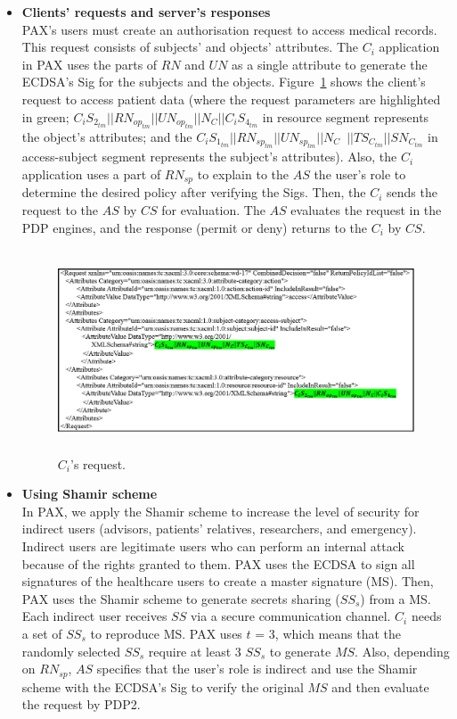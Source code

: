 \documentclass[journal,article,submit,moreauthors,pdftex]{Definitions/mdpi}
\begin{document}
\begin{itemize}
\item \textbf{Clients' requests and server's responses}\\
PAX's users must create an authorisation request to access medical records. This request
consists of subjects' and objects' attributes.
The $C_i$ application in PAX uses the parts of $RN$ and $UN$ as a single attribute to
generate the ECDSA's Sig for the subjects and the objects. Figure~\ref{fig:request}
shows the client's request to access patient data (where the request parameters are
highlighted in green; $C_iS_{2_{tm}}||RN_{op_{tm}}||UN_{op_{tm}}||N_{C}||C_iS_{4_{tm}}$
in resource segment represents the object's attributes; and the $C_iS_{1_{tm}}||RN_{sp_{tm}}||UN_{sp_{tm}}||N_{C}$\ $||TS_{C_{tm}}||SN_{C_{tm}}$ in access-subject segment represents the subject's attributes). Also, the $C_i$ application uses a part of $RN_{sp}$
to explain to the $AS$ the user's role to determine the desired policy after verifying the Sigs. Then, the $C_i$ sends the request to the $AS$ by $CS$ for evaluation. The $AS$ evaluates the request in the PDP engines, and the response (permit or deny) returns to the $C_i$ by $CS$.
\begin{figure}[ht!]
\centering
  \includegraphics[width=14cm,height=6cm]{request.png}
	\caption{$C_i$'s request.}
	\label{fig:request}
\end{figure}
\item \textbf{Using Shamir scheme}\\
In PAX, we apply the Shamir scheme to increase the level of security for indirect users (advisors, patients' relatives, researchers, and emergency). Indirect users are legitimate
users who can perform an internal attack because of the rights granted to them.
PAX uses the ECDSA to sign all signatures of the healthcare users to create a
master signature (MS). Then, PAX uses the Shamir scheme to generate secrets sharing ($SS_s$)
from a MS. Each indirect user receives $SS$ via a secure communication channel. $C_i$ needs
a set of $SS_s$ to reproduce MS. PAX uses $t$ = 3, which means that the randomly selected
$SS_s$ require at least 3 $SS_s$  to generate $MS$.  Also, depending on $RN_ {sp}$, $AS$ specifies that the user's role is indirect and use the Shamir scheme with the ECDSA's Sig to verify
the original $MS$ and then evaluate the request by PDP2.


\end{itemize}
\end{document}
